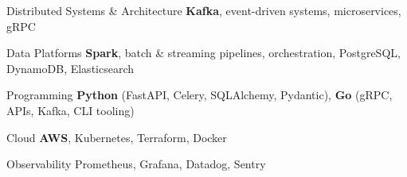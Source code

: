 

\begin{cvskills}

  \cvskill
    {Distributed Systems \& Architecture}
    {\textbf{Kafka}, event-driven systems, microservices, gRPC}

  \cvskill
    {Data Platforms}
    {\textbf{Spark}, batch \& streaming pipelines, orchestration, PostgreSQL, DynamoDB, Elasticsearch}

  \cvskill
  {Programming} %
  {\textbf{Python} (FastAPI, Celery, SQLAlchemy, Pydantic), \textbf{Go} (gRPC, APIs, Kafka, CLI tooling)}

  \cvskill
    {Cloud} %
    {\textbf{AWS}, Kubernetes, Terraform, Docker}

  \cvskill
    {Observability} %
    {Prometheus, Grafana, Datadog, Sentry}
\end{cvskills}
